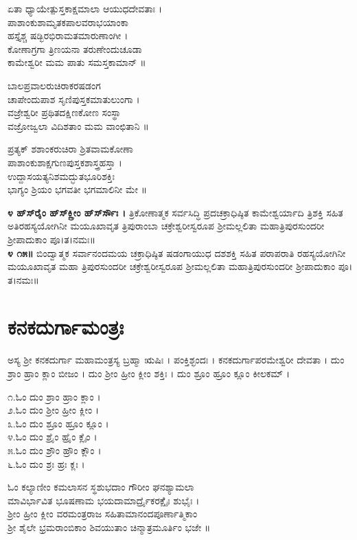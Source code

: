 ಏತಾ ಧ್ಯಾಯೇತ್ಪುಸ್ತಕಾಕ್ಷಮಾಲಾ ಆಯುಧದೇವತಾಃ ।\\
ಪಾಶಾಂಕುಶಾಮೃತಕಪಾಲವರಾಭಯಾಂಕಾ\\ ಹಸ್ತೈಶ್ಚ ಷಡ್ಭಿರಭಿರಾಮತಮಾರುಣಾಂಗೀ । \\ಕೋಣಾಗ್ರಗಾ ತ್ರಿಣಯನಾ ತರುಣೇಂದುಚೂಡಾ \\ಕಾಮೇಶ್ವರೀ ಮಮ ಪಾತು ಸಮಸ್ತಕಾಮಾನ್ ॥

ಬಾಲಪ್ರವಾಲರುಚಿರಾಕರಷಡಂಗ\\ಚಾಪೇಂದುಪಾಶ ಸೃಣಿಪುಸ್ತಕಮಾತುಲುಂಗಾ ।\\ ವಜ್ರೇಶ್ವರೀ ಪ್ರಥಿತದಕ್ಷಿಣಕೋಣ ಸಂಸ್ಥಾ \\ವಜ್ರೋಜ್ವಲಾ ವಿದಿಶತಾಂ ಮಮ ವಾಂಛಿತಾನಿ ॥

ಪ್ರತ್ಯಕ್ ಶಶಾಂಕರುಚಿರಾ ಶ್ರಿತವಾಮಕೋಣಾ\\ಪಾಶಾಂಕುಶಾಕ್ಷಗುಣಪುಸ್ತಕಶಾಸ್ತ್ರಹಸ್ತಾ ।\\ ಉದ್ದಾಸಯತ್ಯನಿಶಮದ್ಭುತಭೂರಿಶಕ್ತಿಃ \\ಭಾಗ್ಯಂ ಶ್ರಿಯಂ ಭಗವತೀ ಭಗಮಾಲಿನೀ ಮೇ ॥

{\bfseries ೪ ಹ್‌ಸ್‌ರೈಂ ಹ್‌ಸ್‌ಕ್ಲ್ರೀಂ ಹ್‌ಸ್‌ರ್ಸೌಃ ।} ತ್ರಿಕೋಣಾತ್ಮಕ ಸರ್ವಸಿದ್ಧಿ ಪ್ರದಚಕ್ರಾಧಿಷ್ಠಿತ ಕಾಮೇಶ್ವರ್ಯಾದಿ ತ್ರಿಶಕ್ತಿ ಸಹಿತ ಅತಿರಹಸ್ಯಯೋಗಿನೀ ಮಯೂಖಾವೃತ ತ್ರಿಪುರಾಂಬಾ ಚಕ್ರೇಶ್ವರೀಸ್ವರೂಪ ಶ್ರೀಮಲ್ಲಲಿತಾ ಮಹಾತ್ರಿಪುರಸುಂದರೀ ಶ್ರೀಪಾದುಕಾಂ ಪೂ।ತ।ನಮಃ॥\\
{\bfseries ೪ ೧೫॥} ಬಿಂದ್ವಾತ್ಮಕ ಸರ್ವಾನಂದಮಯ ಚಕ್ರಾಧಿಷ್ಠಿತ ಷಡಂಗಾಯುಧ ದಶಶಕ್ತಿ ಸಹಿತ ಪರಾಪರಾತಿ ರಹಸ್ಯಯೋಗಿನೀ ಮಯೂಖಾವೃತ ಮಹಾ ತ್ರಿಪುರಸುಂದರೀ ಚಕ್ರೇಶ್ವರೀಸ್ವರೂಪ ಶ್ರೀಮಲ್ಲಲಿತಾ ಮಹಾತ್ರಿಪುರಸುಂದರೀ ಶ್ರೀಪಾದುಕಾಂ ಪೂ।ತ।ನಮಃ॥


\section{ಕನಕದುರ್ಗಾಮಂತ್ರಃ}
ಅಸ್ಯ ಶ್ರೀ ಕನಕದುರ್ಗಾ ಮಹಾಮಂತ್ರಸ್ಯ ಬ್ರಹ್ಮಾ ಋಷಿಃ  ।  ಪಂಕ್ತಿಶ್ಛಂದಃ । ಕನಕದುರ್ಗಾಪರಮೇಶ್ವರೀ ದೇವತಾ । ದುಂ ಶ್ರಾಂ ಹ್ರಾಂ ಕ್ಲಾಂ ಬೀಜಂ । ದುಂ ಶ್ರೀಂ ಹ್ರೀಂ ಕ್ಲೀಂ ಶಕ್ತಿಃ । ದುಂ ಶ್ರೂಂ ಹ್ರೂಂ ಕ್ಲೂಂ ಕೀಲಕಮ್ । 

೧.ಓಂ ದುಂ ಶ್ರಾಂ ಹ್ರಾಂ ಕ್ಲಾಂ ।\\ 
೨.ಓಂ ದುಂ ಶ್ರೀಂ ಹ್ರೀಂ ಕ್ಲೀಂ ।\\
೩.ಓಂ ದುಂ ಶ್ರೂಂ ಹ್ರೂಂ ಕ್ಲೂಂ ।\\ 
೪.ಓಂ ದುಂ ಶ್ರೈಂ ಹ್ರೈಂ ಕ್ಲೈಂ ।\\
೫.ಓಂ ದುಂ ಶ್ರೌಂ ಹ್ರೌಂ ಕ್ಲೌಂ ।\\
೬.ಓಂ ದುಂ ಶ್ರಃ ಹ್ರಃ ಕ್ಲಃ ।

ಓಂ ಕಲ್ಯಾಣೀಂ ಕಮಲಾಸನ ಸ್ಥಶುಭದಾಂ ಗೌರೀಂ ಘನಶ್ಯಾಮಲಾ\\ಮಾವಿರ್ಭಾವಿತ ಭೂಷಣಾಮ ಭಯದಾಮಾರ್ದ್ರೈಕರಕ್ಷೆೈಃ ಶುಭೈಃ ।\\
ಶ್ರೀಂ ಹ್ರೀಂ ಕ್ಲೀಂ ವರಮಂತ್ರರಾಜ ಸಹಿತಾಮಾನಂದಪೂರ್ಣಾತ್ಮಿಕಾಂ\\ ಶ್ರೀ ಶೈಲೇ ಭ್ರಮರಾಂಬಿಕಾಂ ಶಿವಯುತಾಂ ಚಿನ್ಮಾತ್ರಮೂರ್ತಿಂ ಭಜೇ ॥

